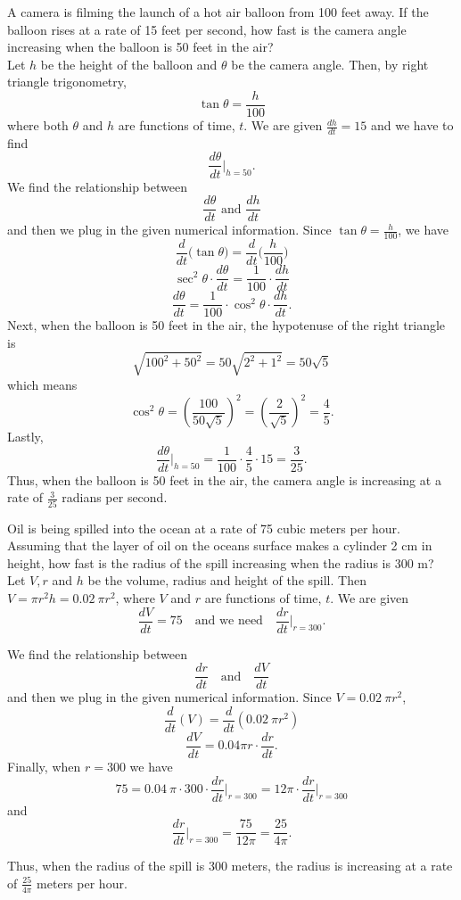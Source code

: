 \documentclass{ximera}
\begin{document}
\begin{example}[example 12]
A camera is filming the launch of a hot air balloon from 100 feet away. 
If the balloon rises at a rate of 15 feet per second, how fast is the camera angle increasing when the balloon is 50 feet in the air?\\
Let $h$ be the height of the balloon and $\theta$ be the camera angle. Then, by right triangle trigonometry, 
\[\tan \theta  = \frac{h}{100}\]
where both $\theta$ and $h$ are functions of time, $t$.
We are given $\frac{dh}{dt} = 15$ and we have to find
\[\frac{d\theta}{dt}\bigg|_{h = 50}.\]
We find the relationship between 
\[\frac{d\theta}{dt} \text{ and } \frac{dh}{dt}\]
and then we plug in the given numerical information.
Since $\tan\theta = \frac{h}{100}$, we have
\[\frac{d}{dt}\big(\tan\theta\big) = \frac{d}{dt} \Big(\frac{h}{100}\Big)\]
 \[\sec^2 \theta \cdot \frac{d\theta}{dt} = \frac{1}{100} \cdot \frac{dh}{dt}\]
\[ \frac{d\theta}{dt} = \frac{1}{100}\cdot\cos^2 \theta  \cdot\frac{dh}{dt}.\]
Next, when the balloon is 50 feet in the air, the hypotenuse of the right triangle is 
\[\sqrt{100^2 + 50^2} = 50\sqrt{2^2 + 1^2} = 50\sqrt 5\]
which means 
\[\cos^2 \theta = \left(\frac{100}{50\sqrt 5}\right)^2 = \left(\frac{2}{\sqrt 5}\right)^2 = \frac45.\]
Lastly,
\[\frac{d\theta}{dt}\bigg|_{h = 50}= \frac{1}{100} \cdot \frac45 \cdot 15 = \frac{3}{25}.\]
Thus, when the balloon is 50 feet in the air, the camera angle is increasing at a rate of $\frac{3}{25}$ radians per second.
\end{example}



\begin{example}[example 13]
Oil is being spilled into the ocean at a rate of 75 cubic meters per hour.  
Assuming that the layer of oil on the oceans surface makes a cylinder  2 cm in height, 
how fast is the radius of the spill increasing when the radius is 300 m?\\
Let $V, r$ and $h$ be the volume, radius and height of the spill.  Then $V = \pi r^2 h = 0.02 \ \pi r^2$,
where $V$ and $r$ are functions of time, $t$. We are given
\[\frac{dV}{dt} = 75 \quad \text{and we need} \quad \frac{dr}{dt}\bigg|_{r = 300}.\]

We find the relationship between 
\[\frac{dr}{dt} \quad \text{and}\quad \frac{dV}{dt}\]
and then we plug in the given numerical information.
Since $V =  0.02\  \pi r^2$,
\[\frac{d}{dt}(V) = \frac{d}{dt}(0.02 \ \pi r^2)\]
\[\frac{dV}{dt} = 0.04 \pi r \cdot \frac{dr}{dt}.\]
Finally, when $r = 300$ we have
\[75 = 0.04 \ \pi \cdot 300 \cdot \frac{dr}{dt}\bigg|_{r= 300} = 12 \pi \cdot \frac{dr}{dt}\bigg|_{r= 300} \]
and
\[\frac{dr}{dt}\bigg|_{r= 300} = \frac{75}{12\pi} = 
\frac{25}{4\pi}.\]





Thus, when the radius of the spill is 300 meters, the radius is increasing at a rate of $\frac{25}{4\pi}$ meters per hour.
\end{example}
\end{document}

